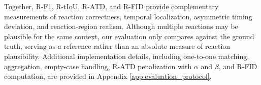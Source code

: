 Together, R-F1, R-tIoU, R-ATD, and R-FID provide complementary measurements of reaction correctness, temporal localization, asymmetric timing deviation, and reaction-region realism. Although multiple reactions may be plausible for the same context, our evaluation only compares against the ground truth, serving as a reference rather than an absolute measure of reaction plausibility. Additional implementation details, including one-to-one matching, aggregation, empty-case handling, R-ATD penalization with $\alpha$ and $\beta$, and R-FID computation, are provided in Appendix \ref{app:evaluation_protocol}.